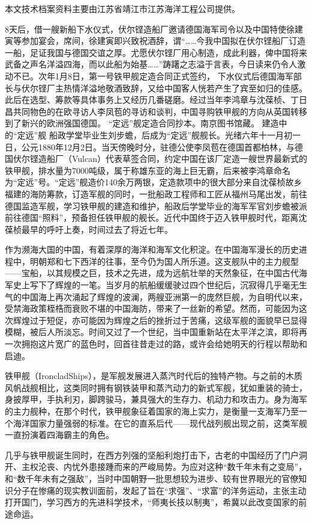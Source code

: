\documentclass[12pt,UTF8]{ctexbook}
\begin{document}
本文技术档案资料主要由江苏省靖江市江苏海洋工程公司提供。


8天后，借一艘新船下水仪式，伏尔铿造船厂邀请德国海军司令以及中国特使徐建寅等参加宴会，席间，徐建寅即兴致祝酒辞，谓“……今我中国拟在伏尔铿船厂订造一船，足证我国与德国交谊之厚。尤愿伏尔铿厂用心制造，成此利器，俾中国将来武备之声名洋溢四海，而以此船为始基……”踌躇之志溢于言表，今日读来仍令人激动不已。次年1月8日，第一号铁甲舰定造合同正式签约，
下水仪式后德国海军部长与伏尔铿厂主热情洋溢地敬酒致辞，又给中国客人恍若产生了宾至如归的佳感。此后在选型、筹款等具体事务上又经历几番磋磨。经过当年李鸿章与沈葆桢、丁日昌共同物色的在欧寻访人李凤苞的寻访和谈判，中国寻购铁甲舰的方向从英国转移到了新兴的欧洲强国德国。
“定远”舰定造合同抄本。南京图书馆藏。
建造中的“定远”舰
船政学堂毕业生刘步蟾，后成为“定远”舰舰长。光绪六年十一月初一日，公元1880年12月2日。当天傍晚时分，驻德公使李凤苞在德国首都柏林，与德国伏尔铿造船厂（Vulcan）代表草签合同，约定中国在该厂定造一艘世界最新式的铁甲舰，排水量为7000吨级，属于称雄东亚的海上巨无霸，后来被李鸿章命名为“定远”号。“定远”舰造价140余万两银，定造款项中的很大部分来自沈葆桢故乡福建的海防筹款，订造军舰的同时，一批船政工程师和工匠从福州马尾出发，前往德国监造军舰，学习铁甲舰的建造和维护，船政后学堂毕业的海军军官刘步蟾被派前往德国“照料”，预备担任铁甲舰的舰长。近代中国终于迈入铁甲舰时代，距离沈葆桢最早的呼吁上奏，时间过去了将近七年。

作为濒海大国的中国，有着深厚的海洋和海军文化积淀。在中国海军漫长的历史进程中，明朝郑和七下西洋的往事，至今仍为国人所乐道。这支舰队中的主力舰型——宝船，以其规模之巨，技术之先进，成为远航壮举的天然象征，在中国古代海军史上写下了辉煌的一笔。当岁月的航船缓缓驶过四个世纪后，沉寂得几乎毫无生气的中国海上再次涌起了辉煌的波澜，两艘亚洲第一的庞然巨舰，为自明代以来，受禁海政策桎梏而衰败不堪的中国海防，带来了一丝新的希望。然而，可能因为这次辉煌过于短促，亦可能因为辉煌之后的挫折过于苦痛，这级军舰的面貌早已显得模糊，被后人所淡忘。时间又过了一个世纪，当中国重新站在太平洋之滨，即将再一次拥抱这片宽广的蓝色时，回首往昔走过的路，或许会给她明天的行程以帮助和启迪。

铁甲舰（IroncladShips），是军舰发展进入蒸汽时代后的独特产物。与之前的木质风帆战舰相比，这类同时拥有钢铁装甲和蒸汽动力的新式军舰，犹如重装的骑士，身披厚甲，手执利刃，脚跨骏马，兼具强大的生存力、机动力和攻击力。身为海军的主力舰种，在那个时代，铁甲舰象征着国家的海上实力，是衡量一支海军乃至一个海洋国家力量强弱的标准。在它的直系后代——现代战列舰出现之前，这类军舰一直扮演着四海霸主的角色。

几乎与铁甲舰诞生同时，在西方列强的坚船利炮打击下，古老的中国经历了门户洞开、主权沦丧、内忧外患接踵而来的严峻局势。为应对这种“数千年未有之变局”，和“数千年未有之强敌”，当时中国朝野一批思想较为进步、较有世界眼光的官僚知识分子在惨痛的现实教训面前，发起了旨在“求强”、“求富”的洋务运动，主张主动打开国门，学习西方的先进科学技术，“师夷长技以制夷”，希冀以此改变国家的前途命运。
\end{document}
